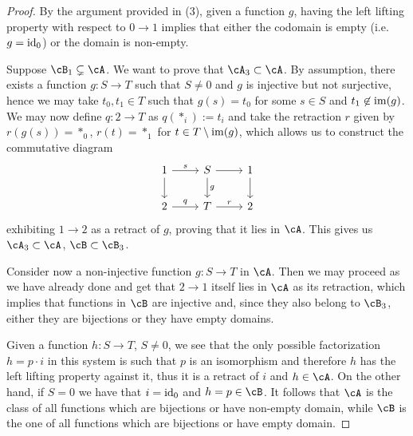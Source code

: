 \documentclass[a4paper,11pt,openany]{scrartcl}
\begin{document}
\begin{proof}
    By the argument provided in (3), given a function $g$, having the left
    lifting property with respect to $0\rightarrow 1$ implies that either the
    codomain is empty (i.e.\ $g=\operatorname{id}_0$) or the domain is non-empty.

    Suppose $\cB_1\subsetneq\cA$. We want to prove that $\cA_3\subset\cA$. By
    assumption, there exists a function $g\colon
    S\rightarrow T$ such that $S\neq 0$ and $g$ is injective but not surjective,
    hence we may take $t_0,t_1\in T$ such that $g(s)=t_0$ for some $s\in S$ and
    $t_1\not\in\operatorname{im}(g)$. We may now define $q\colon 2\rightarrow T$ as
    $q(*_i):=t_i$ and take the retraction $r$ given by $r(g(s))=*_0$, $r(t)=*_1$
    for $t\in T\setminus\operatorname{im}(g)$, which allows us to construct the
    commutative diagram
    \[\begin{tikzcd}
	{1} & {S} & {1} \\
	{2} & {T} & {2}
	\arrow["{s}", from=1-1, to=1-2]
	\arrow[from=1-2, to=1-3]
	\arrow["{q}", from=2-1, to=2-2]
	\arrow["{r}", from=2-2, to=2-3]
	\arrow[from=1-1, to=2-1]
	\arrow["{g}", from=1-2, to=2-2]
	\arrow[from=1-3, to=2-3]
    \end{tikzcd}\]
    exhibiting $1\rightarrow 2$ as a retract of $g$, proving that it lies in
    $\cA$. This gives us $\cA_3\subset\cA$, $\cB\subset\cB_3$.

    Consider now a non-injective function $g\colon S\rightarrow T$ in $\cA$.
    Then we may proceed as we have already done and get that $2\rightarrow 1$
    itself lies in $\cA$ as its
    retraction, which implies that functions in $\cB$ are injective and, since
    they also belong to $\cB_3$, either they are bijections or they have empty
    domains.

    Given a function $h\colon S\rightarrow T$, $S\neq 0$, we see that the only
    possible factorization $h=p\cdot i$ in this system is such that $p$ is an
    isomorphism
    and therefore $h$ has the left lifting property against it, thus it is a
    retract of $i$ and $h\in\cA$. On the other hand, if $S=0$ we have that
    $i=\operatorname{id}_0$ and
    $h=p\in\cB$. It follows that $\cA$ is the class of all functions which are
    bijections or have non-empty domain, while $\cB$ is the one of all functions
    which are bijections or have empty domain.
\end{proof}
\end{document}
